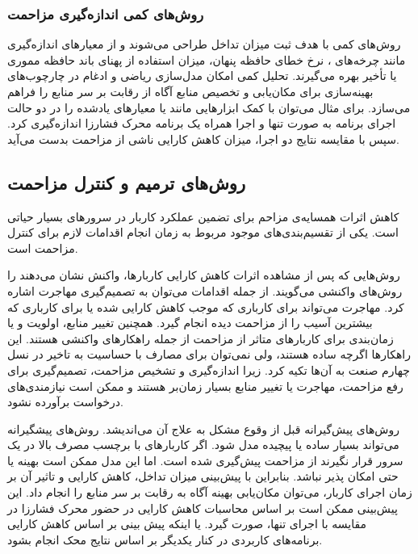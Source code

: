 \subsubsection{روش‌های کمی اندازه‌گیری مزاحمت}

روش‌های کمی با هدف ثبت میزان تداخل طراحی می‌شوند و از معیارهای اندازه‌گیری مانند چرخه‌های ، نرخ خطای حافظه پنهان، میزان استفاده از پهنای باند حافظه مموری یا تأخیر  بهره می‌گیرند. تحلیل کمی امکان مدل‌سازی ریاضی و ادغام در چارچوب‌های بهینه‌سازی برای مکان‌یابی و تخصیص منابع آگاه از رقابت بر سر منابع را فراهم می‌سازد. برای مثال می‌توان با کمک ابزارهایی مانند  یا  معیارهای یادشده را در دو حالت اجرای برنامه به صورت تنها و اجرا همراه یک برنامه محرک فشارزا اندازه‌گیری کرد. سپس با مقایسه نتایج دو اجرا، میزان کاهش کارایی ناشی از مزاحمت بدست می‌آید.

\subsection{روش‌های ترمیم و کنترل مزاحمت}

کاهش اثرات همسایه‌ی مزاحم برای تضمین عملکرد کاربار در سرورهای  بسیار حیاتی است. یکی از تقسیم‌بندی‌های موجود مربوط به زمان انجام اقدامات لازم برای کنترل مزاحمت است. 

روش‌هایی که پس از مشاهده اثرات کاهش کارایی کاربارها، واکنش نشان می‌دهند را روش‌های واکنشی می‌گویند. از جمله اقدامات می‌توان به تصمیم‌گیری مهاجرت اشاره کرد. مهاجرت می‌تواند برای کارباری که موجب کاهش کارایی شده یا برای کارباری که بیشترین آسیب را از مزاحمت دیده انجام گیرد. همچنین تغییر منابع، اولویت و یا زمان‌بندی برای کاربارهای متاثر از مزاحمت از جمله راهکارهای واکنشی هستند. این راهکارها اگرچه ساده هستند، ولی نمی‌توان برای مصارف با حساسیت به تاخیر در نسل چهارم صنعت به آن‌ها تکیه کرد. زیرا اندازه‌گیری و تشخیص مزاحمت، تصمیم‌گیری برای رفع مزاحمت، مهاجرت یا تغییر منابع بسیار زمان‌بر هستند و ممکن است نیازمندی‌های درخواست برآورده نشود.

روش‌های پیش‌گیرانه قبل از وقوع مشکل به علاج آن می‌اندیشد. روش‌های پیشگیرانه می‌تواند بسیار ساده یا پیچیده مدل شود. اگر کاربارهای با برچسب مصرف بالا در یک سرور  قرار نگیرند از مزاحمت پیش‌گیری شده است. اما این مدل ممکن است بهینه یا حتی امکان پذیر نباشد. بنابراین با پیش‌بینی میزان تداخل، کاهش کارایی و تاثیر آن بر زمان اجرای کاربار، می‌توان مکان‌یابی بهینه آگاه به رقابت بر سر منابع را انجام داد. این پیش‌بینی ممکن است بر اساس محاسبات کاهش کارایی در حضور محرک فشارزا در مقایسه با اجرای تنها، صورت گیرد. یا اینکه پیش بینی بر اساس کاهش کارایی برنامه‌های کاربردی در کنار یکدیگر بر اساس نتایج محک انجام بشود.


